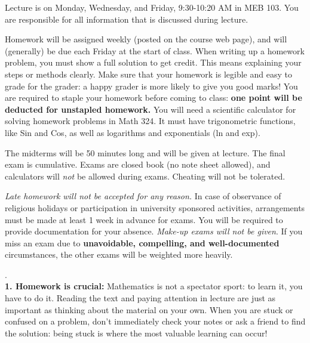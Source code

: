 \documentclass[11 pt]{report}
\begin{document}
\vspace{0.25cm}

  Lecture is on Monday, Wednesday, and Friday, 9:30-10:20 AM in MEB 103.  You
are responsible for all information that is discussed
during lecture.
\vspace{0.25cm}

  Homework will be assigned weekly (posted on the course web page), and will (generally) be due each Friday at the start of class. When writing up a homework problem, you must show a full solution to get credit. This means explaining your steps or methods clearly. Make sure that your homework is legible and easy to grade for the grader: a happy grader is more likely to give you good marks! You are required to staple your homework before coming to class: {\bf one point will be deducted for unstapled homework.} You will need a scientific calculator for solving homework problems in Math 324.  It must have trigonometric functions, like
Sin and Cos, as well as logarithms and exponentials (ln and exp).
\vspace{0.25cm}


  The midterms will be 50 minutes long and
will be given at lecture.  The final exam is cumulative. Exams are closed book (no note sheet allowed), 
and calculators will \emph{not} be allowed during exams. Cheating will not be tolerated. 

\vspace{.25cm}

  \emph{Late homework will not be accepted
for any reason.}  In case of observance of religious holidays or
participation in university sponsored activities, arrangements must
be made at least 1 week in advance for exams. You will be required
to provide documentation for your absence. \emph{Make-up exams will
not be given}.  If you miss an exam due to {\bf unavoidable,
compelling, and well-documented} circumstances, the other exams will
be weighted more heavily. \vspace{0.25cm}

\newpage 

. \\
{\bf1.  Homework is crucial:} Mathematics is not a spectator sport: to learn it, you have to do it.
Reading the text and paying attention in lecture are just as important as thinking about
the material on your own. When you are stuck or confused on a problem, don't immediately check your notes or 
ask a friend to find the solution: being stuck is where the most valuable learning can occur! 
\end{document}
